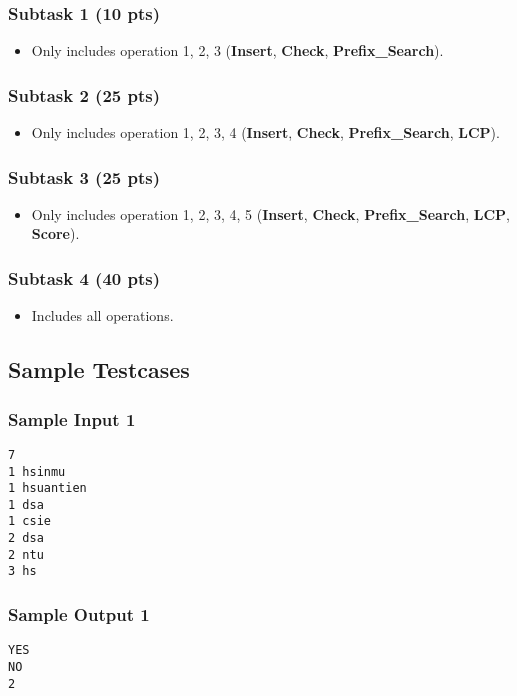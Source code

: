 \subsubsection{Subtask 1 (10 pts)}

\begin{itemize}
    \item Only includes operation 1, 2, 3 (\textbf{Insert}, \textbf{Check}, \textbf{Prefix\_Search}).
\end{itemize}

\subsubsection{Subtask 2 (25 pts)}

\begin{itemize}
    \item Only includes operation 1, 2, 3, 4 (\textbf{Insert}, \textbf{Check}, \textbf{Prefix\_Search}, \textbf{LCP}).
\end{itemize}

\subsubsection{Subtask 3 (25 pts)}

\begin{itemize}
    \item Only includes operation 1, 2, 3, 4, 5 (\textbf{Insert}, \textbf{Check}, \textbf{Prefix\_Search}, \textbf{LCP},  \textbf{Score}).
\end{itemize}

\subsubsection{Subtask 4 (40 pts)}

\begin{itemize}
    \item Includes all operations.
\end{itemize}

\subsection{Sample Testcases}

\begin{multicols}{2}
\subsubsection{Sample Input 1}
\begin{verbatim}
7
1 hsinmu
1 hsuantien
1 dsa
1 csie
2 dsa
2 ntu
3 hs
\end{verbatim}
\columnbreak
\subsubsection{Sample Output 1}
\begin{verbatim}
YES
NO
2





\end{verbatim}
\end{multicols}

